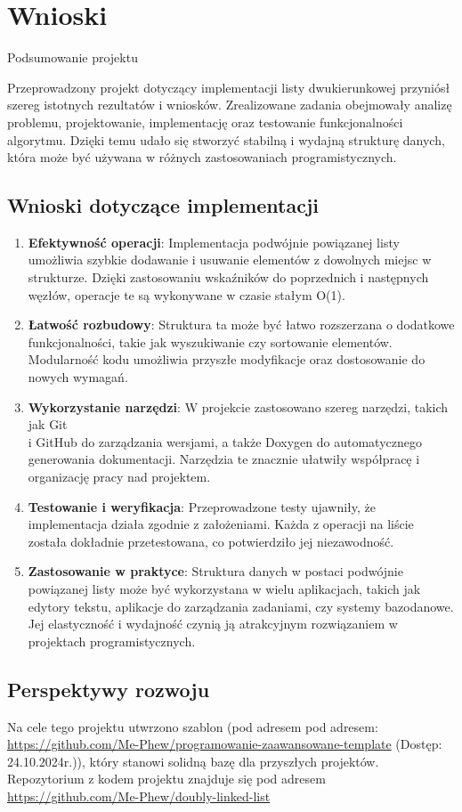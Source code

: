 \newpage
\section{Wnioski}	%

Podsumowanie projektu

Przeprowadzony projekt dotyczący implementacji listy dwukierunkowej przyniósł szereg istotnych rezultatów i wniosków. Zrealizowane zadania obejmowały analizę problemu, projektowanie, implementację oraz testowanie funkcjonalności algorytmu. Dzięki temu udało się stworzyć stabilną i wydajną strukturę danych, która może być używana w różnych zastosowaniach programistycznych.

\subsection{Wnioski dotyczące implementacji}

\begin{enumerate}
	\item \textbf{Efektywność operacji}: Implementacja podwójnie powiązanej listy umożliwia szybkie dodawanie i usuwanie elementów z dowolnych miejsc w strukturze. Dzięki zastosowaniu wskaźników do poprzednich i następnych węzłów, operacje te są wykonywane w czasie stałym O(1).
	\item \textbf{Łatwość rozbudowy}: Struktura ta może być łatwo rozszerzana o dodatkowe funkcjonalności, takie jak wyszukiwanie czy sortowanie elementów. Modularność kodu umożliwia przyszłe modyfikacje oraz dostosowanie do nowych wymagań.
	\item \textbf{Wykorzystanie narzędzi}: W projekcie zastosowano szereg narzędzi, takich jak Git \\ i GitHub do zarządzania wersjami, a także Doxygen do automatycznego generowania dokumentacji. Narzędzia te znacznie ułatwiły współpracę i organizację pracy nad projektem.
	\item \textbf{Testowanie i weryfikacja}: Przeprowadzone testy ujawniły, że implementacja działa zgodnie z założeniami. Każda z operacji na liście została dokładnie przetestowana, co potwierdziło jej niezawodność.
	\item \textbf{Zastosowanie w praktyce}: Struktura danych w postaci podwójnie powiązanej listy może być wykorzystana w wielu aplikacjach, takich jak edytory tekstu, aplikacje do zarządzania zadaniami, czy systemy bazodanowe. Jej elastyczność i wydajność czynią ją atrakcyjnym rozwiązaniem w projektach programistycznych.
\end{enumerate}

\newpage

\subsection{Perspektywy rozwoju}

Na cele tego projektu utwrzono szablon (pod adresem pod adresem: \url{https://github.com/Me-Phew/programowanie-zaawansowane-template}\cite{GitHubProjectTemplate} (Dostęp: 24.10.2024r.)), który stanowi solidną bazę dla przyszłych projektów.
Repozytorium z kodem projektu znajduje się pod adresem \url{https://github.com/Me-Phew/doubly-linked-list}\cite{GitHubProject}
